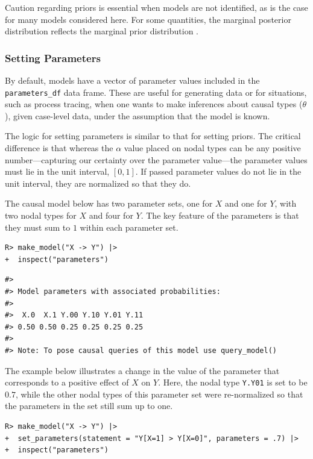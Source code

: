 \documentclass[
  11pt,
  article]{jss}
\begin{document}
Caution regarding priors is essential when models are not identified, as
is the case for many models considered here. For some quantities, the
marginal posterior distribution reflects the marginal prior distribution
\citep{poirier_revising_1998}.

\subsubsection{Setting Parameters}\label{parameters}

By default, models have a vector of parameter values included in the
\texttt{parameters\_df} data frame. These are useful for generating data
or for situations, such as process tracing, when one wants to make
inferences about causal types (\(\theta\)), given case-level data, under
the assumption that the model is known.

The logic for setting parameters is similar to that for setting priors.
The critical difference is that whereas the \(\alpha\) value placed on
nodal types can be any positive number---capturing our certainty over
the parameter value---the parameter values must lie in the unit
interval, \([0,1]\). If passed parameter values do not lie in the unit
interval, they are normalized so that they do.

The causal model below has two parameter sets, one for \(X\) and one for
\(Y\), with two nodal types for \(X\) and four for \(Y\). The key
feature of the parameters is that they must sum to \(1\) within each
parameter set.

\begin{verbatim}
R> make_model("X -> Y") |> 
+  inspect("parameters")
\end{verbatim}

\begin{verbatim}
#> 
#> Model parameters with associated probabilities: 
#> 
#>  X.0  X.1 Y.00 Y.10 Y.01 Y.11 
#> 0.50 0.50 0.25 0.25 0.25 0.25 
#> 
#> Note: To pose causal queries of this model use query_model()
\end{verbatim}

The example below illustrates a change in the value of the parameter
that corresponds to a positive effect of \(X\) on \(Y\). Here, the nodal
type \texttt{Y.Y01} is set to be \(0.7\), while the other nodal types of
this parameter set were re-normalized so that the parameters in the set
still sum up to one.

\begin{verbatim}
R> make_model("X -> Y") |>
+  set_parameters(statement = "Y[X=1] > Y[X=0]", parameters = .7) |>
+  inspect("parameters")
\end{verbatim}
\end{document}
